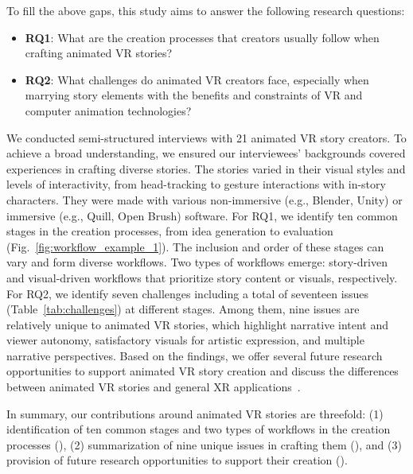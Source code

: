 To fill the above gaps, this study aims to answer the following research questions:

\begin{itemize}[left=0pt]
    \item \textbf{RQ1}: What are the creation processes that creators usually follow when crafting animated VR stories?
    \item \textbf{RQ2}: What challenges do animated VR creators face, especially when marrying story elements with the benefits and constraints of VR and computer animation technologies?
\end{itemize}


We conducted semi-structured interviews with 21 animated VR story creators. To achieve a broad understanding, we ensured our interviewees' backgrounds covered experiences in crafting diverse stories. The stories varied in their visual styles and levels of interactivity, from head-tracking to gesture interactions with in-story characters. They were made with various non-immersive (e.g., Blender, Unity) or immersive (e.g., Quill, Open Brush) software.
%
For RQ1, we identify ten common stages in the creation processes, from idea generation to evaluation (Fig.~\ref{fig:workflow_example_1}). The inclusion and order of these stages can vary and form diverse workflows. Two types of workflows emerge: story-driven and visual-driven workflows that prioritize story content or visuals, respectively. 
%
For RQ2, we identify seven challenges including a total of seventeen issues (Table~\ref{tab:challenges}) at different stages. Among them, nine issues are relatively unique to animated VR stories, which highlight narrative intent and viewer autonomy, satisfactory visuals for artistic expression, and multiple narrative perspectives. 
Based on the findings, we offer several future research opportunities to support animated VR story creation and discuss the differences between animated VR stories and general XR applications~\cite{krauss2021current, ashtari2020creating, krauss2022elements}. 

In summary, our contributions around animated VR stories are threefold: (1) identification of ten common stages and two types of workflows in the creation processes (), (2) summarization of nine unique issues in crafting them (), and (3) provision of future research opportunities to support their creation ().